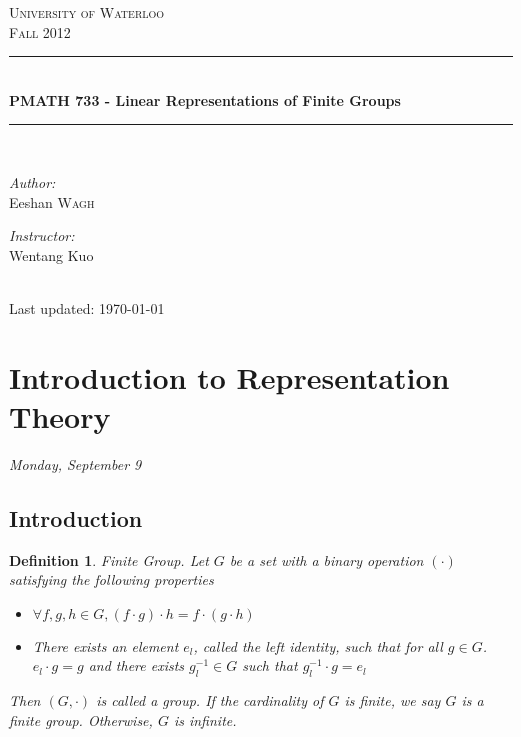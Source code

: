 \documentclass[letterpaper, leqno, 12pt]{article}
\theoremstyle{stdthm}
\theoremstyle{stddef}
\newtheorem{defn}[thm]{Definition}
\theoremstyle{stdnonum}
\theoremstyle{stdqands}
\theoremstyle{stdbold}
\begin{document}
\begin{titlepage}
\begin{center}
\textsc{\LARGE University of Waterloo}\\[1cm]
\textsc{\Large Fall 2012}\\[0.5cm]
\rule{\linewidth}{0.5mm} \\[0.4cm]
{\Large \bf PMATH 733 - Linear Representations of Finite Groups}\\[0.2cm]
\rule{\linewidth}{0.5mm} \\[1cm]
\begin{minipage}{0.4\textwidth}
\begin{flushleft} \large
\emph{Author:}\\
Eeshan \textsc{Wagh}
\end{flushleft}
\end{minipage}
\begin{minipage}{0.4\textwidth}
\begin{flushright} \large
\emph{Instructor:} \\
Wentang Kuo
\end{flushright}
\end{minipage}
\\[1cm]
Last updated: \today \\
\end{center}

\tableofcontents

\end{titlepage}

\newpage




\section{Introduction to Representation Theory}
\begin{center}
\emph{Monday, September 9}
\end{center}
\subsection{Introduction}
\begin{defn} {Finite Group.} Let $G$ be a set with a binary operation $(\cdot)$ satisfying the following properties
\begin{itemize}
\item $\forall f,g,h\in G, (f \cdot g)\cdot h = f\cdot (g \cdot h)$
\item There exists an element $e_l$, called the left identity, such that for all $g\in G$. $e_l \cdot g = g$ and there exists $g_l^{-1} \in G$ such that $g_l^{-1} \cdot g = e_l$
\end{itemize}
Then $(G,\cdot)$ is called a group. If the cardinality of $G$ is finite, we say $G$ is a finite group. Otherwise, $G$ is infinite. 
\end{defn}
\end{document}
